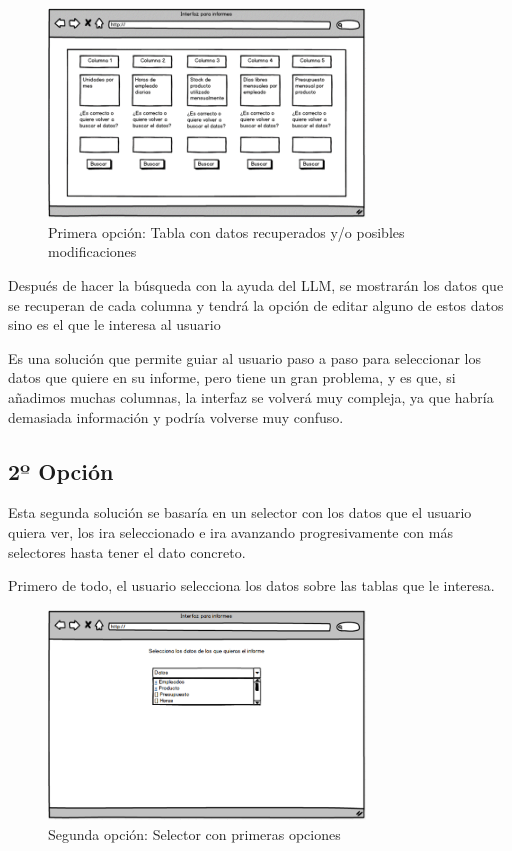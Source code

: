 \begin{figure}[hp!]
    \centering
    \includegraphics[width=0.75\textwidth]{imaxes/iteracion1.2.png}
    \caption{Primera opción: Tabla con datos recuperados y/o posibles modificaciones}
    \label{fig:iteracion1.2}
\end{figure}

Después de hacer la búsqueda con la ayuda del LLM, se mostrarán los datos que se recuperan de cada columna y tendrá la opción de editar 
alguno de estos datos sino es el que le interesa al usuario
  
Es una solución que permite guiar al usuario paso a paso para seleccionar los datos que quiere en su informe, 
pero tiene un gran problema, y es que, si añadimos muchas columnas, la interfaz se volverá muy compleja, ya que habría 
demasiada información y podría volverse muy confuso.

\subsection{2º Opción}

Esta segunda solución se basaría en un selector con los datos que el usuario quiera ver, los ira seleccionado e ira avanzando progresivamente 
con más selectores hasta tener el dato concreto.

Primero de todo, el usuario selecciona los datos sobre las tablas que le interesa.

\begin{figure}[hp!]
    \centering
    \includegraphics[width=0.75\textwidth]{imaxes/iteracion1.3.png}
    \caption{Segunda opción: Selector con primeras opciones}
    \label{fig:iteracion1.3}
\end{figure}

